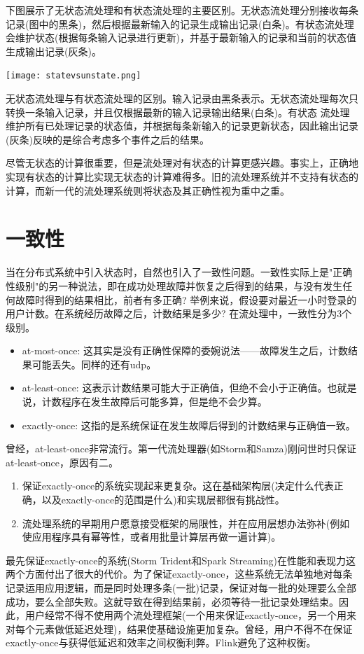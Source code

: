 \documentclass[oneside]{ctexbook}
\begin{document}
下图展示了无状态流处理和有状态流处理的主要区别。无状态流处理分别接收每条记录(图中的黑条)，然后根据最新输入的记录生成输出记录(白条)。有状态流处理会维护状态(根据每条输入记录进行更新)，并基于最新输入的记录和当前的状态值生成输出记录(灰条)。

\noindent \texttt{[image: statevsunstate.png]}

无状态流处理与有状态流处理的区别。输入记录由黑条表示。无状态流处理每次只转换一条输入记录，并且仅根据最新的输入记录输出结果(白条)。有状态 流处理维护所有已处理记录的状态值，并根据每条新输入的记录更新状态，因此输出记录(灰条)反映的是综合考虑多个事件之后的结果。

尽管无状态的计算很重要，但是流处理对有状态的计算更感兴趣。事实上，正确地实现有状态的计算比实现无状态的计算难得多。旧的流处理系统并不支持有状态的计算，而新一代的流处理系统则将状态及其正确性视为重中之重。

\section{一致性}

当在分布式系统中引入状态时，自然也引入了一致性问题。一致性实际上是"正确性级别"的另一种说法，即在成功处理故障并恢复之后得到的结果，与没有发生任何故障时得到的结果相比，前者有多正确? 举例来说，假设要对最近一小时登录的用户计数。在系统经历故障之后，计数结果是多少? 在流处理中，一致性分为3个级别。

\begin{itemize}
\item at-most-once: 这其实是没有正确性保障的委婉说法——故障发生之后，计数结果可能丢失。同样的还有udp。
\item at-least-once: 这表示计数结果可能大于正确值，但绝不会小于正确值。也就是说，计数程序在发生故障后可能多算，但是绝不会少算。
\item exactly-once: 这指的是系统保证在发生故障后得到的计数结果与正确值一致。
\end{itemize}

曾经，at-least-once非常流行。第一代流处理器(如Storm和Samza)刚问世时只保证at-least-once，原因有二。

\begin{enumerate}
\item 保证exactly-once的系统实现起来更复杂。这在基础架构层(决定什么代表正确，以及exactly-once的范围是什么)和实现层都很有挑战性。
\item 流处理系统的早期用户愿意接受框架的局限性，并在应用层想办法弥补(例如使应用程序具有幂等性，或者用批量计算层再做一遍计算)。
\end{enumerate}
最先保证exactly-once的系统(Storm Trident和Spark Streaming)在性能和表现力这两个方面付出了很大的代价。为了保证exactly-once，这些系统无法单独地对每条记录运用应用逻辑，而是同时处理多条(一批)记录，保证对每一批的处理要么全部成功，要么全部失败。这就导致在得到结果前，必须等待一批记录处理结束。因此，用户经常不得不使用两个流处理框架(一个用来保证exactly-once，另一个用来对每个元素做低延迟处理)，结果使基础设施更加复杂。曾经，用户不得不在保证exactly-once与获得低延迟和效率之间权衡利弊。Flink避免了这种权衡。
\end{document}
